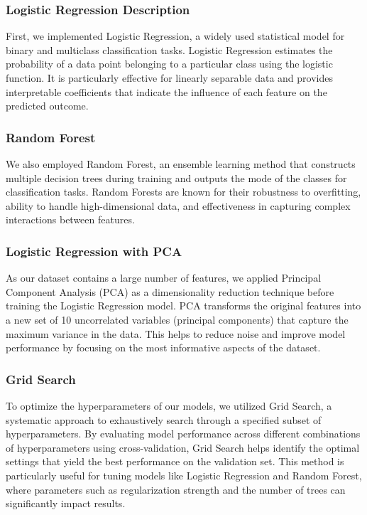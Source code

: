 \documentclass[12pt, a4paper]{article}
\begin{document}
\subsubsection{Logistic Regression Description}

First, we implemented Logistic Regression, a widely used statistical model for binary and multiclass classification tasks. Logistic Regression estimates the probability of a data point belonging to a particular class using the logistic function. It is particularly effective for linearly separable data and provides interpretable coefficients that indicate the influence of each feature on the predicted outcome.

\subsubsection{Random Forest}

We also employed Random Forest, an ensemble learning method that constructs multiple decision trees during training and outputs the mode of the classes for classification tasks. Random Forests are known for their robustness to overfitting, ability to handle high-dimensional data, and effectiveness in capturing complex interactions between features.

\subsubsection{Logistic Regression with PCA}

As our dataset contains a large number of features, we applied Principal Component Analysis (PCA) as a dimensionality reduction technique before training the Logistic Regression model. PCA transforms the original features into a new set of 10 uncorrelated variables (principal components) that capture the maximum variance in the data. This helps to reduce noise and improve model performance by focusing on the most informative aspects of the dataset.

\subsubsection{Grid Search}

To optimize the hyperparameters of our models, we utilized Grid Search, a systematic approach to exhaustively search through a specified subset of hyperparameters. By evaluating model performance across different combinations of hyperparameters using cross-validation, Grid Search helps identify the optimal settings that yield the best performance on the validation set. This method is particularly useful for tuning models like Logistic Regression and Random Forest, where parameters such as regularization strength and the number of trees can significantly impact results.
\end{document}
